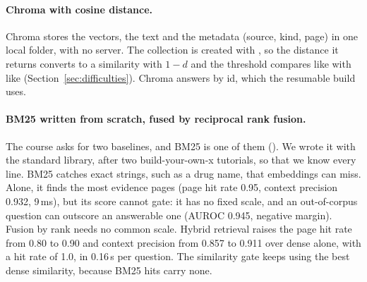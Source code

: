 \paragraph{Chroma with cosine distance.}
Chroma stores the vectors, the text and the metadata (source, kind, page) in one local folder, with
no server. The collection is created with , so the distance it returns
converts to a similarity with $1 - d$ and the threshold compares like with like
(Section~\ref{sec:difficulties}). Chroma answers  by id, which the resumable build uses.

\paragraph{BM25 written from scratch, fused by reciprocal rank fusion.}
The course asks for two baselines, and BM25 is one of them (). We wrote it with the
standard library, after two build-your-own-x tutorials, so that we know every line. BM25 catches
exact strings, such as a drug name, that embeddings can miss. Alone, it finds the most evidence
pages (page hit rate 0.95, context precision 0.932, 9\,ms), but its score cannot gate: it has no
fixed scale, and an out-of-corpus question can outscore an answerable one (AUROC 0.945, negative
margin). Fusion by rank needs no common scale. Hybrid retrieval raises the page hit rate from 0.80
to 0.90 and context precision from 0.857 to 0.911 over dense alone, with a hit rate of 1.0, in
0.16\,s per question. The similarity gate keeps using the best dense similarity, because BM25 hits
carry none.

